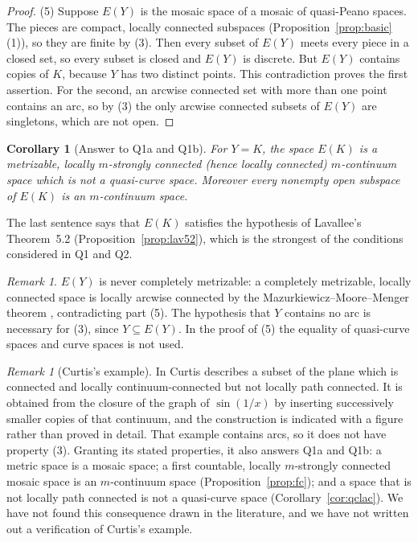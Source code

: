 \documentclass[11pt]{amsart}
\newtheorem{corollary}[theorem]{Corollary}
\theoremstyle{definition}
\theoremstyle{remark}
\newtheorem{remark}[theorem]{Remark}
\numberwithin{equation}{section}
\begin{document}
\begin{proof}
(5) Suppose $E(Y)$ is the mosaic space of a mosaic of quasi-Peano spaces. The pieces are compact, locally connected subspaces (Proposition~\ref{prop:basic}(1)), so they are finite by (3). Then every subset of $E(Y)$ meets every piece in a closed set, so every subset is closed and $E(Y)$ is discrete. But $E(Y)$ contains copies of $K$, because $Y$ has two distinct points. This contradiction proves the first assertion. For the second, an arcwise connected set with more than one point contains an arc, so by (3) the only arcwise connected subsets of $E(Y)$ are singletons, which are not open.
\end{proof}

\begin{corollary}[Answer to Q1a and Q1b]\label{cor:Q1}
For $Y=K$, the space $E(K)$ is a metrizable, locally $m$-strongly connected (hence locally connected) $m$-continuum space which is not a quasi-curve space. Moreover every nonempty open subspace of $E(K)$ is an $m$-continuum space.
\end{corollary}
The last sentence says that $E(K)$ satisfies the hypothesis of Lavallee's Theorem~5.2 (Proposition~\ref{prop:lav52}), which is the strongest of the conditions considered in Q1 and Q2.

\begin{remark}\label{rem:complete}
$E(Y)$ is never completely metrizable: a completely metrizable, locally connected space is locally arcwise connected by the Mazurkiewicz--Moore--Menger theorem \cite[Section~6.3]{engelking}, contradicting part (5). The hypothesis that $Y$ contains no arc is necessary for (3), since $Y\subseteq E(Y)$. In the proof of (5) the equality of quasi-curve spaces and curve spaces is not used.
\end{remark}

\begin{remark}[Curtis's example]\label{rem:curtis}
In \cite[Example~1.8]{curtis80} Curtis describes a subset of the plane which is connected and locally continuum-connected but not locally path connected. It is obtained from the closure of the graph of $\sin(1/x)$ by inserting successively smaller copies of that continuum, and the construction is indicated with a figure rather than proved in detail. That example contains arcs, so it does not have property (3). Granting its stated properties, it also answers Q1a and Q1b: a metric space is a mosaic space; a first countable, locally $m$-strongly connected mosaic space is an $m$-continuum space (Proposition~\ref{prop:fc}); and a space that is not locally path connected is not a quasi-curve space (Corollary~\ref{cor:qclac}). We have not found this consequence drawn in the literature, and we have not written out a verification of Curtis's example.
\end{remark}
\end{document}
